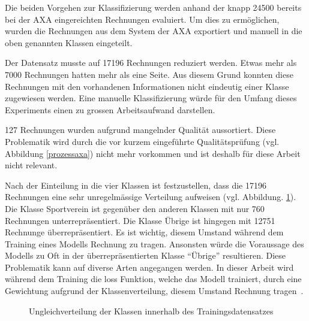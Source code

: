 Die beiden Vorgehen zur Klassifizierung werden anhand der knapp 24500 bereits bei der AXA eingereichten Rechnungen evaluiert. Um dies zu ermöglichen, wurden die Rechnungen aus dem System der AXA exportiert und manuell in die oben genannten Klassen eingeteilt. 

Der Datensatz musste auf 17196 Rechnungen reduziert werden. Etwas mehr als 7000 Rechnungen hatten mehr als eine Seite. Aus diesem Grund konnten diese Rechnungen mit den vorhandenen Informationen nicht eindeutig einer Klasse zugewiesen werden. Eine manuelle Klassifizierung würde für den Umfang dieses Experiments einen zu grossen Arbeitsaufwand darstellen.

127 Rechnungen wurden aufgrund mangelnder Qualität aussortiert. Diese Problematik wird durch die vor kurzem eingeführte Qualitätsprüfung (vgl. Abbildung \ref{prozessaxa}) nicht mehr vorkommen und ist deshalb für diese Arbeit nicht relevant.

Nach der Einteilung in die vier Klassen ist festzustellen, dass die 17196 Rechnungen eine sehr unregelmässige Verteilung aufweisen (vgl. Abbildung. \ref{class-distribution}). Die Klasse Sportverein ist gegenüber den anderen Klassen mit nur 760 Rechnungen unterrepräsentiert. Die Klasse Übrige ist hingegen mit 12751 Rechnunge überrepräsentiert. Es ist wichtig, diesem Umstand während dem Training eines Modells Rechnung zu tragen. Ansonsten würde die Voraussage des Modells zu Oft in der überrepräsentierten Klasse \enquote{Übrige} resultieren. Diese Problematik kann auf diverse Arten angegangen werden. In dieser Arbeit wird während dem Training die loss Funktion, welche das Modell trainiert, durch eine Gewichtung aufgrund der Klassenverteilung, diesem Umstand Rechnung tragen~\autocite{Buda2018}.

\begin{figure}[h]
    \captionsetup{width=.8\linewidth}
    \caption{Ungleichverteilung der Klassen innerhalb des Trainingsdatensatzes}
    \label{class-distribution}
    \centering
\end{figure}
